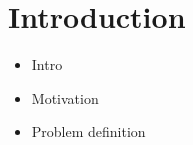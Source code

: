 \section{Introduction}

\begin{itemize}
    \item Intro
    \item Motivation
    \item Problem definition
\end{itemize}
